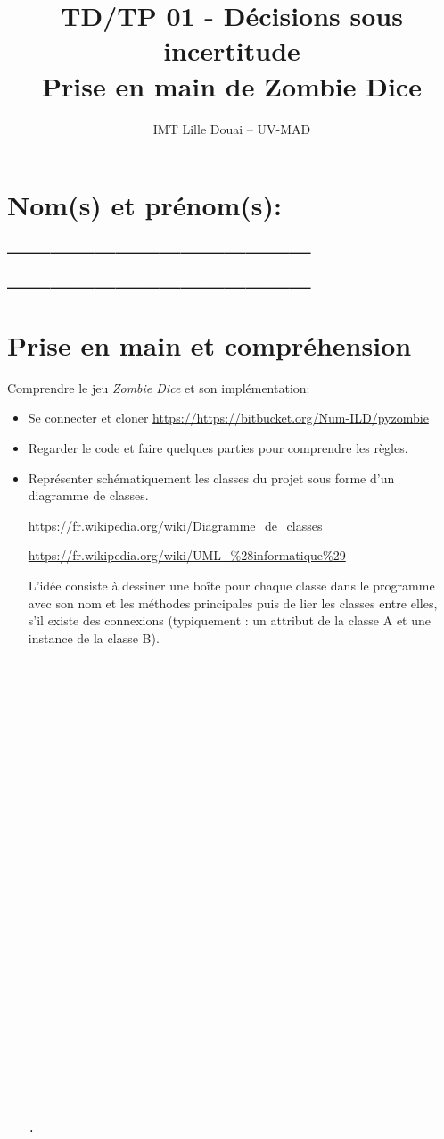 \documentclass[a4paper, 10pt]{article}
\begin{document}
\author{IMT Lille Douai -- UV-MAD}
\date{}
\title{\Large{\textbf{TD/TP 01 - Décisions sous incertitude \\ Prise en main de Zombie Dice}}}
\maketitle
\thispagestyle{fancy}

\section*{Nom(s) et prénom(s): \_\_\_\_\_\_\_\_\_\_\_\_\_\_ $\quad$ \_\_\_\_\_\_\_\_\_\_\_\_\_\_}

\bigskip

\section{Prise en main et compréhension}

Comprendre le jeu \emph{Zombie Dice} et son implémentation:
\begin{itemize}[$\bigcirc$]
\item Se connecter et cloner \url{https://https://bitbucket.org/Num-ILD/pyzombie}
\item Regarder le code et faire quelques parties pour comprendre les règles.
\item Représenter schématiquement les classes du projet sous forme d'un diagramme de classes.

\url{https://fr.wikipedia.org/wiki/Diagramme_de_classes}

\url{https://fr.wikipedia.org/wiki/UML\_\%28informatique\%29}

L'idée consiste à dessiner une boîte pour chaque classe dans le programme avec son nom et les méthodes principales puis de lier les classes entre elles, s'il existe des connexions (typiquement : un attribut de la classe A et une instance de la classe B).

\medskip
\begin{lstlisting}[caption={Diagramme de classes}]































.
\end{lstlisting}

\end{itemize}
\end{document}
